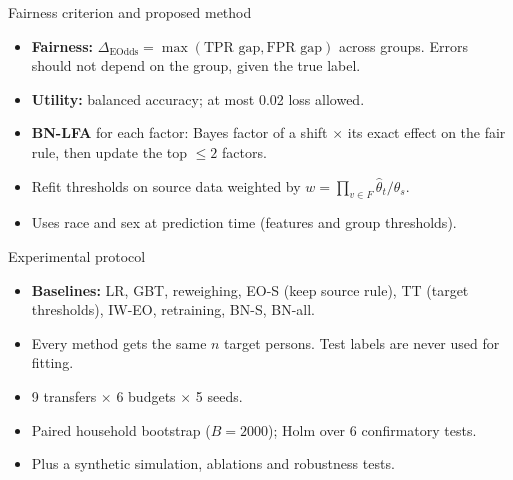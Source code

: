 \documentclass[aspectratio=169,11pt]{beamer}
\newcommand{\EO}{\Delta_{\mathrm{EOdds}}}
\begin{document}
\begin{frame}{Fairness criterion and proposed method}
\begin{itemize}[<+->]
\item \textbf{Fairness:} $\EO = \max(\text{TPR gap}, \text{FPR gap})$ across groups. Errors should not depend on the
group, given the true label.
\item \textbf{Utility:} balanced accuracy; at most 0.02 loss allowed.
\item \textbf{BN-LFA} for each factor: Bayes factor of a shift $\times$ its exact effect on the fair rule, then update
the top $\le 2$ factors.
\item Refit thresholds on source data weighted by $w=\prod_{v\in F}\hat\theta_t/\theta_s$.
\item Uses race and sex at prediction time (features and group thresholds).
\end{itemize}
\end{frame}

\begin{frame}{Experimental protocol}
\begin{itemize}[<+->]
\item \textbf{Baselines:} LR, GBT, reweighing, EO-S (keep source rule), TT (target thresholds), IW-EO, retraining,
BN-S, BN-all.
\item Every method gets the same $n$ target persons. Test labels are never used for fitting.
\item 9 transfers $\times$ 6 budgets $\times$ 5 seeds.
\item Paired household bootstrap ($B = 2000$); Holm over 6 confirmatory tests.
\item Plus a synthetic simulation, ablations and robustness tests.
\end{itemize}
\end{frame}
\end{document}
